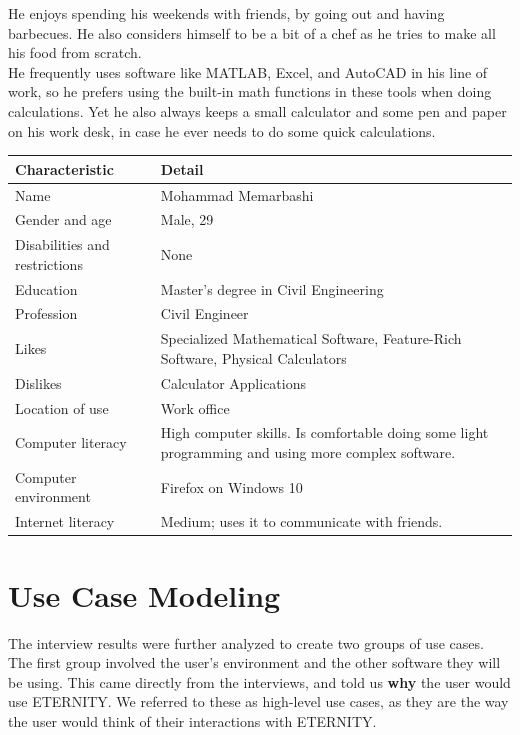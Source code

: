 \documentclass[11pt,onside]{report}
\begin{document}
He enjoys spending his weekends with friends, by going out and having barbecues. He also considers himself to be a bit of a chef as he tries to make all his food from scratch. \\

He frequently uses software like MATLAB, Excel, and AutoCAD in his line of work, so he prefers using the built-in math functions in these tools when doing calculations. Yet he also always keeps a small calculator and some pen and paper on his work desk, in case he ever needs to do some quick calculations.
\begin{center}
    \begin{tabular}{|p{4cm}|p{10cm}|}
        \hline
        \bf{Characteristic} & \bf{Detail} \\
        \hline
        Name &   Mohammad Memarbashi \\
        \hline
        Gender and age & Male, 29 \\
        \hline
        Disabilities and restrictions & None \\
        \hline
        Education & Master's degree in Civil Engineering \\
        \hline
        Profession & Civil Engineer \\
        \hline
        Likes & Specialized Mathematical Software, Feature-Rich Software, Physical Calculators \\
        \hline
        Dislikes & Calculator Applications \\
        \hline
        Location of use & Work office \\
        \hline
        Computer literacy & High computer skills. Is comfortable doing some light programming and using more complex software. \\
        \hline
        Computer environment &  Firefox on Windows 10 \\
        \hline
        Internet literacy & Medium; uses it to communicate with friends. \\
        \hline
    \end{tabular}
\end{center}

\section{Use Case Modeling}
The interview results were further analyzed to create two groups of use cases. \\

The first group involved the user's environment and the other software they will be using. This came directly from the interviews, and told us \textbf{why} the user would use ETERNITY. We referred to these as high-level use cases, as they are the way the user would think of their interactions with ETERNITY. \\
\end{document}
